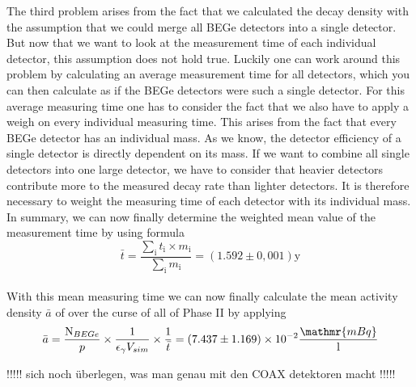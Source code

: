 The third problem arises from the fact that we calculated the decay density with the assumption that we could merge all BEGe detectors into a single detector.
But now that we want to look at the measurement time of each individual detector, this assumption does not hold true.
Luckily one can work around this problem by calculating an average measurement time for all detectors, which you can then calculate as if the BEGe detectors were such a single detector.
For this average measuring time one has to consider the fact that we also have to apply a weigh on every individual measuring time.
This arises from the fact that every BEGe detector has an individual mass.
As we know, the detector efficiency of a single detector is directly dependent on its mass.
If we want to combine all single detectors into one large detector, we have to consider that heavier detectors contribute more to the measured decay rate than lighter detectors.
It is therefore necessary to weight the measuring time of each detector with its individual mass.
\\

In summary, we can now finally determine the weighted mean value of the measurement time by using formula
\begin{equation*}
    \bar{t} = \frac{\sum_\mathrm{i} t_\mathrm{i} \times m_\mathrm{i}}{\sum_\mathrm{i} m_\mathrm{i}} = (1.592\pm0,001)
    \mathrm{y}
\end{equation*}
\\

With this mean measuring time we can now finally calculate the mean activity density $\bar{a}$ of  over the curse of all of Phase II by applying
\begin{equation*}
    \bar{a} = \frac{\mathrm{N}_{BEGe}}{p}\times\frac{1}{\epsilon_\gamma V_{sim}}\times\frac{1}{\bar{t}} = (7.437\pm1.169)\times10^{-2}
     \frac{\mathmr{mBq}}{\mathrm{l}}
\end{equation*}

!!!!! sich noch überlegen, was man genau mit den COAX detektoren macht !!!!!



